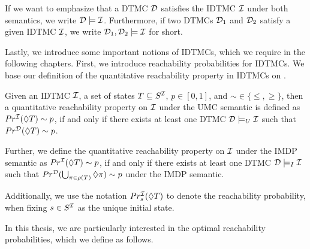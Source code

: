 
If we want to emphasize that a DTMC $\mathcal{D}$ satisfies the IDTMC $\mathcal{I}$ under both semantics, we write $\mathcal{D}\models\mathcal{I}$. Furthermore, if two DTMCs $\mathcal{D}_1$ and $\mathcal{D}_2$ satisfy a given IDTMC $\mathcal{I}$, we write $\mathcal{D}_1, \mathcal{D}_2 \models \mathcal{I}$ for short.

Lastly, we introduce some important notions of IDTMCs, which we require in the following chapters.
First, we introduce reachability probabilities for IDTMCs. We base our definition of the quantitative reachability property in IDTMCs on \cite{reachability_in_pIMCs_using_constraints}. 
\begin{definition}\label{def:reachability_probability_IDTMCs}
    Given an IDTMC $\mathcal{I}$, a set of states $T \subseteq S^{\mathcal{I}}$, $p \in [0,1]$, and $\sim \in \{\leq,\geq\}$, then a quantitative reachability property on $\mathcal{I}$ under the UMC semantic is defined as 
    $Pr^{\mathcal{I}}(\lozenge T) \sim p$, if and only if there exists at least one DTMC $\mathcal{D} \models_U \mathcal{I}$ such that $Pr^{\mathcal{D}}(\lozenge T) \sim p$. 

    Further, we define the quantitative reachability property on $\mathcal{I}$ under the IMDP semantic as 
    $Pr^{\mathcal{I}}(\lozenge T) \sim p$, if and only if there exists at least one DTMC $\mathcal{D} \models_I \mathcal{I}$ such that $Pr^{\mathcal{D}}(\bigcup_{\pi\in\rho(T)}\lozenge \pi) \sim p$ under the IMDP semantic.
\end{definition}
Additionally, we use the notation $Pr^{\mathcal{I}}_s(\lozenge T)$ to denote the reachability probability, when fixing $s\in S^{\mathcal{I}}$ as the unique initial state.

In this thesis, we are particularly interested in the optimal reachability probabilities, which we define as follows.

